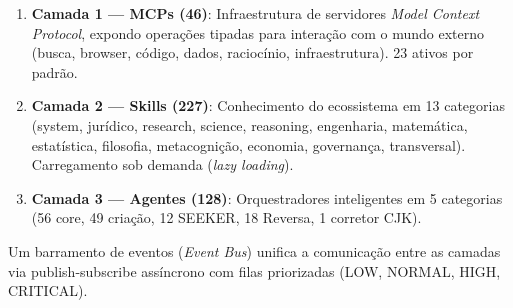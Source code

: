 \begin{enumerate}
  \item \textbf{Camada 1 --- MCPs (46)}: Infraestrutura de servidores
        \emph{Model Context Protocol}, expondo operações tipadas para
        interação com o mundo externo (busca, browser, código, dados,
        raciocínio, infraestrutura). 23 ativos por padrão.
  \item \textbf{Camada 2 --- Skills (227)}: Conhecimento do ecossistema
        em 13 categorias (system, jurídico, research, science, reasoning,
        engenharia, matemática, estatística, filosofia, metacognição,
        economia, governança, transversal). Carregamento sob demanda
        (\emph{lazy loading}).
  \item \textbf{Camada 3 --- Agentes (128)}: Orquestradores inteligentes
        em 5 categorias (56 core, 49 criação, 12 SEEKER, 18 Reversa,
        1 corretor CJK).
\end{enumerate}

\noindent Um barramento de eventos (\emph{Event Bus}) unifica a comunicação
entre as camadas via publish-subscribe assíncrono com filas priorizadas
(LOW, NORMAL, HIGH, CRITICAL).

